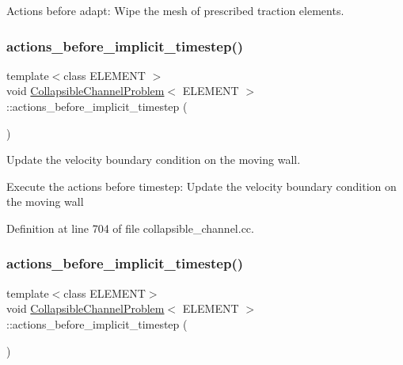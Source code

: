 Actions before adapt\+: Wipe the mesh of prescribed traction elements. 

\mbox{\label{classCollapsibleChannelProblem_a4c365050b11c184007b8e1cd6079147f}} 
\subsubsection{\texorpdfstring{actions\+\_\+before\+\_\+implicit\+\_\+timestep()}{actions\_before\_implicit\_timestep()}\hspace{0.1cm}{\footnotesize\ttfamily [1/2]}}
{\footnotesize\ttfamily template$<$class E\+L\+E\+M\+E\+NT $>$ \\
void \hyperlink{classCollapsibleChannelProblem}{Collapsible\+Channel\+Problem}$<$ E\+L\+E\+M\+E\+NT $>$\+::actions\+\_\+before\+\_\+implicit\+\_\+timestep (\begin{DoxyParamCaption}{ }\end{DoxyParamCaption})}



Update the velocity boundary condition on the moving wall. 

Execute the actions before timestep\+: Update the velocity boundary condition on the moving wall 

Definition at line 704 of file collapsible\+\_\+channel.\+cc.

\mbox{\label{classCollapsibleChannelProblem_a4c365050b11c184007b8e1cd6079147f}} 
\subsubsection{\texorpdfstring{actions\+\_\+before\+\_\+implicit\+\_\+timestep()}{actions\_before\_implicit\_timestep()}\hspace{0.1cm}{\footnotesize\ttfamily [2/2]}}
{\footnotesize\ttfamily template$<$class E\+L\+E\+M\+E\+NT$>$ \\
void \hyperlink{classCollapsibleChannelProblem}{Collapsible\+Channel\+Problem}$<$ E\+L\+E\+M\+E\+NT $>$\+::actions\+\_\+before\+\_\+implicit\+\_\+timestep (\begin{DoxyParamCaption}{ }\end{DoxyParamCaption})}



